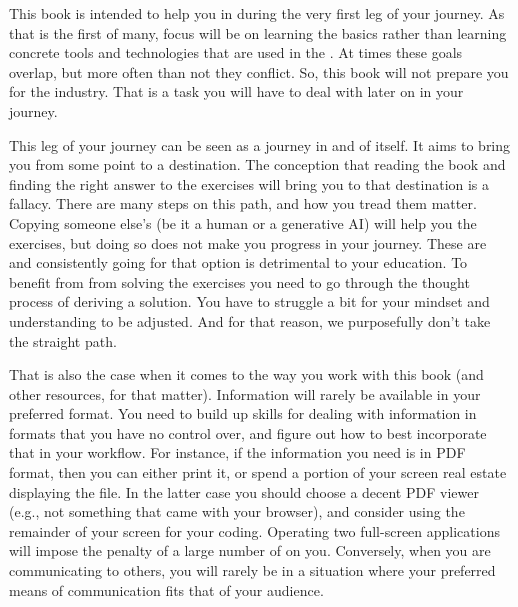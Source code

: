 This book is intended to help you in during the very first leg of your journey. As that is the first of many, focus will be on learning the basics rather than learning concrete tools and technologies that are used in the . At times these goals overlap, but more often than not they conflict. So, this book will not prepare you for the industry. That is a task you will have to deal with later on in your journey.

This leg of your journey can be seen as a journey in and of itself. It aims to bring you from some point to a destination. The conception that reading the book and finding the right answer to the exercises will bring you to that destination is a fallacy. There are many steps on this path, and how you tread them matter.
Copying someone else's  (be it a human or a generative AI) will help you  the exercises, but doing so does not make you progress in your journey. These are  and consistently going for that option is detrimental to your education. To benefit from from solving the exercises you need to go through the thought process of deriving a solution. You have to struggle a bit for your mindset and understanding to be adjusted. And for that reason, we purposefully don't take the straight path.

That is also the case when it comes to the way you work with this book (and other resources, for that matter). Information will rarely be available in your preferred format. You need to build up skills for dealing with information in formats that you have no control over, and figure out how to best incorporate that in your workflow. For instance, if the information you need is in PDF format, then you can either print it, or spend a portion of your screen real estate displaying the file. In the latter case you should choose a decent PDF viewer (e.g., not something that came with your browser), and consider using the remainder of your screen for your coding. Operating two full-screen applications will impose the penalty of a large number of  on you. Conversely, when you are communicating to others, you will rarely be in a situation where your preferred means of communication fits that of your audience.


